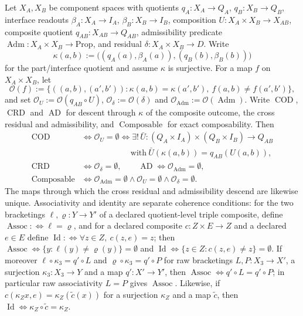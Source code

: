 \begin{theorem}[Composability]\label{thm:F28}
Let \(X_A,X_B\) be component spaces with quotients
\(q_A:X_A\to Q_A\), \(q_B:X_B\to Q_B\), interface readouts
\(\beta_A:X_A\to I_A\), \(\beta_B:X_B\to I_B\), composition
\(U:X_A\times X_B\to X_{AB}\), composite quotient
\(q_{AB}:X_{AB}\to Q_{AB}\), admissibility predicate
\(\operatorname{Adm}:X_A\times X_B\to\mathrm{Prop}\), and residual
\(\delta:X_A\times X_B\to D\).  Write
\[
  \kappa(a,b):=\bigl((q_A(a),\beta_A(a)),(q_B(b),\beta_B(b))\bigr)
\]
for the part/interface quotient and assume \(\kappa\) is surjective.
For a map \(f\) on \(X_A\times X_B\), let
\[
  \mathcal O(f)
  :=
  \{((a,b),(a',b')) :
     \kappa(a,b)=\kappa(a',b'),\ f(a,b)\ne f(a',b')\},
\]
and set \(\mathcal O_U:=\mathcal O(q_{AB}\circ U)\),
\(\mathcal O_{\delta}:=\mathcal O(\delta)\) and
\(\mathcal O_{\operatorname{Adm}}:=\mathcal O(\operatorname{Adm})\).
Write \(\operatorname{COD}\), \(\operatorname{CRD}\) and
\(\operatorname{AD}\) for descent through \(\kappa\) of the composite
outcome, the cross residual and admissibility, and
\(\operatorname{Composable}\) for exact composability.  Then
\begin{align*}
  \operatorname{COD}
  &\iff
  \mathcal O_U=\emptyset
  \iff
    \exists!\,\bar U:(Q_A\times I_A)\times(Q_B\times I_B)\to Q_{AB}\\
  &\hspace{6em}\text{with}\ \bar U(\kappa(a,b))=q_{AB}(U(a,b)),\\
  \operatorname{CRD}
  &\iff
  \mathcal O_{\delta}=\emptyset,
  \qquad
  \operatorname{AD}
  \iff
  \mathcal O_{\operatorname{Adm}}=\emptyset,\\
  \operatorname{Composable}
  &\iff
  \mathcal O_{\operatorname{Adm}}=\emptyset
  \wedge\mathcal O_U=\emptyset
  \wedge\mathcal O_{\delta}=\emptyset.
\end{align*}
The maps through which the cross residual and admissibility descend are likewise unique.
Associativity and identity are separate coherence conditions: for the
two bracketings \(\ell,\varrho:Y\to Y'\) of a declared quotient-level triple
composite, define \(\operatorname{Assoc}:\Longleftrightarrow\ell=\varrho\), and
for a declared composite \(c:Z\times E\to Z\) and a declared \(e\in E\) define
\(\operatorname{Id}:\Longleftrightarrow\forall z\in Z,\ c(z,e)=z\); then
\(\operatorname{Assoc}\iff\{y:\ell(y)\ne\varrho(y)\}=\emptyset\) and
\(\operatorname{Id}\iff\{z\in Z:c(z,e)\ne z\}=\emptyset\). If moreover \(\ell\circ\kappa_3=q'\circ L\) and \(\varrho\circ\kappa_3=q'\circ P\) for raw bracketings \(L,P:X_3\to X'\), a surjection \(\kappa_3:X_3\to Y\) and a map \(q':X'\to Y'\), then \(\operatorname{Assoc}\iff q'\circ L=q'\circ P\); in particular raw associativity \(L=P\) gives \(\operatorname{Assoc}\). Likewise, if \(c(\kappa_Z x,e)=\kappa_Z(\tilde c(x))\) for a surjection \(\kappa_Z\) and a map \(\tilde c\), then \(\operatorname{Id}\iff\kappa_Z\circ\tilde c=\kappa_Z\).
\end{theorem}
